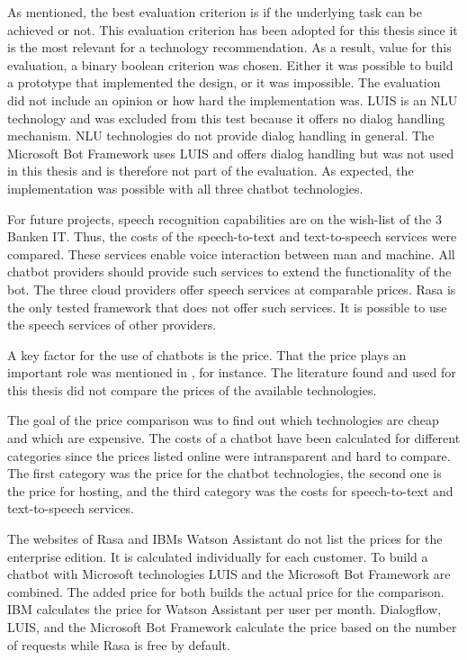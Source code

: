 As \citet{singhbuilding} mentioned, the best evaluation criterion is if the underlying task can be achieved or not.
This evaluation criterion has been adopted for this thesis since it is the 
most relevant for a technology recommendation.
As a result, value for this evaluation, a binary boolean criterion was chosen.
Either it was possible to build a prototype that implemented the design, or it was impossible.
The evaluation did not include an opinion or how hard the implementation was.
LUIS is an NLU technology and was excluded from this test because it offers no dialog handling mechanism.
NLU technologies do not provide dialog handling in general. 
The Microsoft Bot Framework uses LUIS and offers dialog handling but was not used in this thesis and is therefore not part of the evaluation.
As expected, the implementation was possible with all three chatbot technologies.

For future projects, speech recognition capabilities are on the wish-list of the 3 Banken IT.
Thus, the costs of the speech-to-text and text-to-speech services were compared.
These services enable voice interaction between man and machine.
All chatbot providers should provide such services to extend the functionality of the bot.
The three cloud providers offer speech services at comparable prices.
Rasa is the only tested framework that does not offer such services.
It is possible to use the speech services of other providers.

A key factor for the use of chatbots is the price.
That the price plays an important role was mentioned in \citet{buiildChatbotsPython}, for instance.
The literature found and used for this thesis did not compare the prices of the available technologies.

The goal of the price comparison was to find out which technologies are cheap and which are expensive.
The costs of a chatbot have been calculated for different categories since the prices listed online were intransparent and hard to compare.
The first category was the price for the chatbot technologies, the second 
one is the price for hosting, and the third category was the costs
for speech-to-text and text-to-speech services.

The websites of Rasa and IBMs Watson Assistant do not list the prices for the enterprise edition. 
It is calculated individually for each customer.
To build a chatbot with Microsoft technologies LUIS and the Microsoft Bot Framework are combined.
The added price for both builds the actual price for the comparison.
IBM calculates the price for Watson Assistant per user per month.
Dialogflow, LUIS, and the Microsoft Bot Framework calculate the price based on the number of requests while Rasa is free by default.

